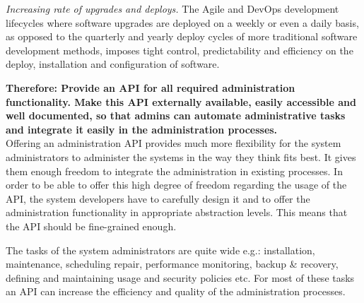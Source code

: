 \textit{Increasing rate of upgrades and deploys.} The Agile and DevOps development lifecycles where software upgrades are deployed on a weekly or even a  daily basis, as opposed to the quarterly and yearly deploy cycles of more traditional software development methods, imposes tight control, predictability and efficiency on the deploy, installation and configuration of software. \cite{Humble2010}
\begin{center}
   
\end{center}

\textbf{Therefore: Provide an API for all required administration functionality. Make this API externally available, easily accessible and well documented, so that admins can automate administrative tasks and integrate it easily in the administration processes.}\\




Offering an administration API provides much more flexibility for the system administrators to administer the systems in the way they think fits best. It gives them enough freedom to integrate the administration in existing processes. In order to be able to offer this high degree of freedom regarding the usage of the API, the system developers have to carefully design it and to offer the administration functionality in appropriate abstraction levels. This means that the API should be fine-grained enough.

The tasks of the system administrators are quite wide e.g.: installation, maintenance, scheduling repair, performance monitoring, backup \& recovery, defining and maintaining usage and security policies etc. For most of these tasks an API can increase the efficiency and quality of the administration processes. 

